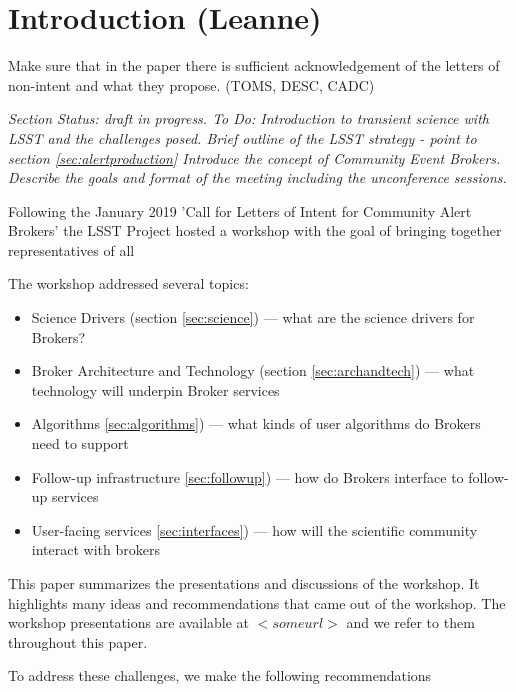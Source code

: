 \section{Introduction (Leanne)} \label{sec:intro}

Make sure that in the paper there is sufficient acknowledgement of the letters of non-intent and what they propose.  (TOMS, DESC, CADC)


{\it Section Status: draft in progress. 
To Do: 
Introduction to transient science with LSST and the challenges posed.  
Brief outline of the LSST strategy - point to section \ref{sec:alertproduction}
Introduce the concept of Community Event Brokers.   
Describe the goals and format of the meeting including the unconference sessions. }

Following the January 2019 'Call for Letters of Intent for Community Alert Brokers'  
\citep{LDM-612}
the LSST Project hosted a workshop with the goal of bringing together representatives of all 

The workshop addressed several topics: 
\begin{itemize}
    \item Science Drivers (section \ref{sec:science}) --- what are the science drivers for Brokers?
    \item Broker Architecture and Technology (section \ref{sec:archandtech}) --- what technology will underpin Broker services 
    \item Algorithms \ref{sec:algorithms}) ---  what kinds of user algorithms do Brokers need to support 
    \item Follow-up infrastructure \ref{sec:followup}) --- how do Brokers interface to follow-up services 
    \item User-facing services \ref{sec:interfaces}) --- how will the scientific community interact with brokers 
\end{itemize}

This paper summarizes the presentations and discussions of the workshop. It highlights many ideas and recommendations that came out of the workshop. The workshop presentations are available at $<someurl>$ and we refer to them throughout this paper.


To address these challenges, we make the following recommendations

